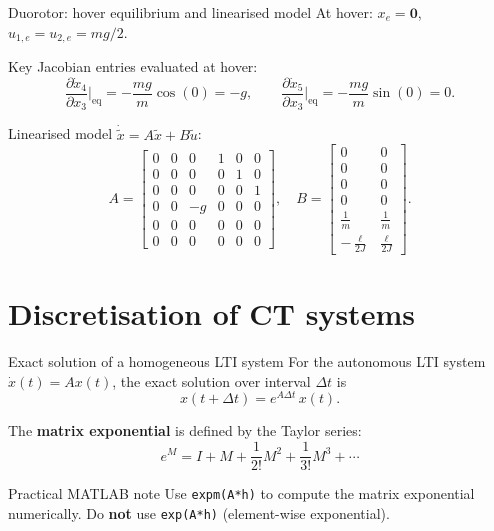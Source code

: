 \documentclass[aspectratio=169,10pt]{beamer}
\begin{document}
\begin{frame}{Duorotor: hover equilibrium and linearised model}
At hover: $x_e=\mathbf{0}$, $u_{1,e}=u_{2,e}=mg/2$.

Key Jacobian entries evaluated at hover:
\[
\frac{\partial \dot{x}_4}{\partial x_3}\bigg|_{\text{eq}}
=-\frac{mg}{m}\cos(0)=-g,
\qquad
\frac{\partial \dot{x}_5}{\partial x_3}\bigg|_{\text{eq}}
=-\frac{mg}{m}\sin(0)=0.
\]

Linearised model $\dot{\tilde{x}}=A\tilde{x}+B\tilde{u}$:
\[
A=
\begin{bmatrix}
0 & 0 & 0 & 1 & 0 & 0\\
0 & 0 & 0 & 0 & 1 & 0\\
0 & 0 & 0 & 0 & 0 & 1\\
0 & 0 & -g & 0 & 0 & 0\\
0 & 0 & 0 & 0 & 0 & 0\\
0 & 0 & 0 & 0 & 0 & 0
\end{bmatrix},
\quad
B=
\begin{bmatrix}
0 & 0\\
0 & 0\\
0 & 0\\
0 & 0\\
\frac{1}{m} & \frac{1}{m}\\[3pt]
-\frac{\ell}{2J} & \frac{\ell}{2J}
\end{bmatrix}.
\]
\end{frame}

\section{Discretisation of CT systems}

\begin{frame}{Exact solution of a homogeneous LTI system}
For the autonomous LTI system $\dot{x}(t)=Ax(t)$,
the exact solution over interval $\Delta t$ is
\[
x(t+\Delta t)=e^{A\Delta t}\,x(t).
\]

The \textbf{matrix exponential} is defined by the Taylor series:
\[
e^{M}= I + M + \frac{1}{2!}M^2 + \frac{1}{3!}M^3 + \cdots
\]

\begin{notebox}{Practical MATLAB note}
Use \texttt{expm(A*h)} to compute the matrix exponential numerically.
Do \textbf{not} use \texttt{exp(A*h)} (element-wise exponential).
\end{notebox}
\end{frame}
\end{document}
